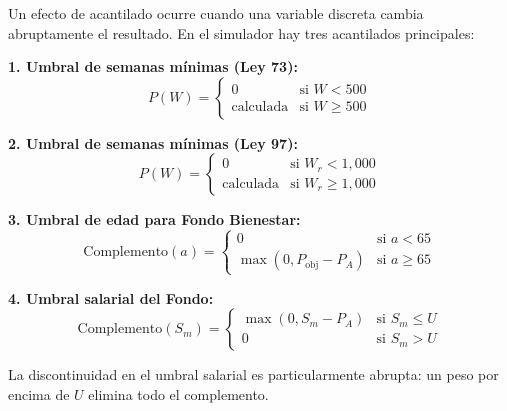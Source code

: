 \documentclass[11pt,a4paper]{report}
\theoremstyle{remark}
\begin{document}
\begin{tcolorbox}[colback=blue!5!white, colframe=blue!75!black, title=\textbf{Definici\'on Formal}]
Un efecto de acantilado ocurre cuando una variable discreta cambia abruptamente el resultado. En el simulador hay tres acantilados principales:

\textbf{1. Umbral de semanas m\'inimas (Ley 73):}
\begin{equation}
P(W) = \begin{cases}
0 & \text{si } W < 500 \\
\text{calculada} & \text{si } W \geq 500
\end{cases}
\end{equation}

\textbf{2. Umbral de semanas m\'inimas (Ley 97):}
\begin{equation}
P(W) = \begin{cases}
0 & \text{si } W_r < 1{,}000 \\
\text{calculada} & \text{si } W_r \geq 1{,}000
\end{cases}
\end{equation}

\textbf{3. Umbral de edad para Fondo Bienestar:}
\begin{equation}
\text{Complemento}(a) = \begin{cases}
0 & \text{si } a < 65 \\
\max(0, P_{\text{obj}} - P_A) & \text{si } a \geq 65
\end{cases}
\end{equation}

\textbf{4. Umbral salarial del Fondo:}
\begin{equation}
\text{Complemento}(S_m) = \begin{cases}
\max(0, S_m - P_A) & \text{si } S_m \leq U \\
0 & \text{si } S_m > U
\end{cases}
\end{equation}

La discontinuidad en el umbral salarial es particularmente abrupta: un peso por encima de $U$ elimina todo el complemento.
\end{tcolorbox}
\end{document}
